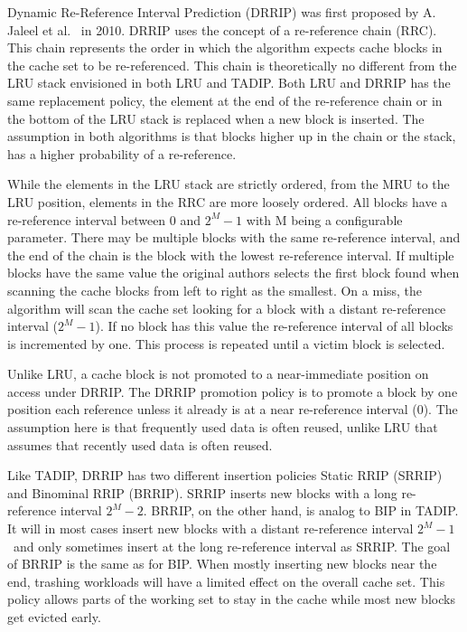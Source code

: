 Dynamic Re-Reference Interval Prediction (DRRIP) was first proposed by A. Jaleel et al.~\cite{Jaleel2010} in 2010.
DRRIP uses the concept of a re-reference chain (RRC).
This chain represents the order in which the algorithm expects cache blocks in the cache set to be re-referenced.
This chain is theoretically no different from the LRU stack envisioned in both LRU and TADIP. 
Both LRU and DRRIP has the same replacement policy, the element at the end of the re-reference chain or in the bottom of the LRU stack is replaced when a new block is inserted.
The assumption in both algorithms is that blocks higher up in the chain or the stack, has a higher probability of a re-reference.

While the elements in the LRU stack are strictly ordered, from the MRU to the LRU position, elements in the RRC are more loosely ordered.
All blocks have a re-reference interval between 0 and $2^M - 1$ with M being a configurable parameter.
There may be multiple blocks with the same re-reference interval, and the end of the chain is the block with the lowest re-reference interval.
If multiple blocks have the same value the original authors selects the first block found when scanning the cache blocks from left to right as the smallest.
On a miss, the algorithm will scan the cache set looking for a block with a distant re-reference interval ($2^M - 1$). 
If no block has this value the re-reference interval of all blocks is incremented by one. 
This process is repeated until a victim block is selected.

Unlike LRU, a cache block is not promoted to a near-immediate position on access under DRRIP. 
The DRRIP promotion policy is to promote a block by one position each reference unless it already is at a near re-reference interval (0).
The assumption here is that frequently used data is often reused, unlike LRU that assumes that recently used data is often reused.

Like TADIP, DRRIP has two different insertion policies Static RRIP (SRRIP) and Binominal RRIP (BRRIP).
SRRIP inserts new blocks with a long re-reference interval $2^M - 2$.
BRRIP, on the other hand, is analog to BIP in TADIP. 
It will in most cases insert new blocks with a distant re-reference interval $2^M - 1$ and only sometimes insert at the long re-reference interval as SRRIP.
The goal of BRRIP is the same as for BIP.
When mostly inserting new blocks near the end, trashing workloads will have a limited effect on the overall cache set.
This policy allows parts of the working set to stay in the cache while most new blocks get evicted early.


